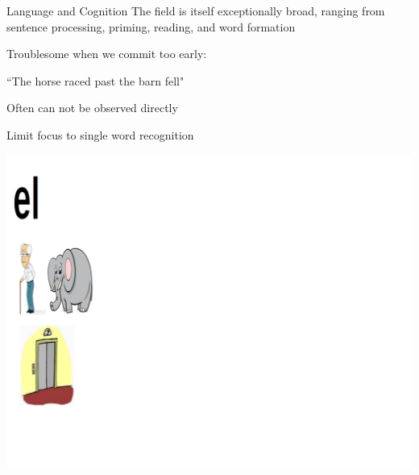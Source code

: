 \documentclass{beamer}
\newcommand{\vp}{\vspace{2mm}}
\begin{document}
\begin{frame}{Language and Cognition}\large
The field is itself exceptionally broad, ranging from sentence processing, priming, reading, and word formation \vspace{4mm}


Troublesome when we commit too early: \vp

\begin{center}
``The horse raced past the barn fell"  \vspace{4mm}
\end{center}

Often can not be observed directly  \vspace{4mm}

Limit focus to single word recognition 



\end{frame}


\begin{frame}
\begin{center}
\includegraphics[scale=0.3]{img/ele_1.png}
\end{center}
\end{frame}
\end{document}
